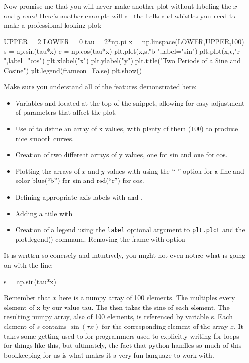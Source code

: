 Now promise me that you will never make another plot without labeling
the $x$ and $y$ axes! Here's another example will all the bells and
whistles you need to make a professional looking plot:
\begin{python}
UPPER = 2
LOWER = 0
tau   = 2*np.pi
x = np.linspace(LOWER,UPPER,100)
s = np.sin(tau*x)
c = np.cos(tau*x)
plt.plot(x,s,"b-",label="sin")
plt.plot(x,c,"r-",label="cos")
plt.xlabel("x")
plt.ylabel("y")
plt.title("Two Periods of a Sine and Cosine")
plt.legend(frameon=False)
plt.show()
\end{python}
Make sure you understand all of the features demonstrated here:
\begin{itemize}
 \item Variables  and  located at the top of
   the snippet, allowing for easy adjustment of parameters that affect
   the plot.
 \item Use of  to define an array of x values, with
   plenty of them (100) to produce nice smooth curves.
 \item Creation of two different arrays of y values, one for sin and one for cos.
 \item Plotting the arrays of $x$ and $y$ values with  using the ``-'' option for a line and color blue(``b'') for sin and red(``r'') for cos. 
 \item Defining appropriate axis labels with  and . 
 \item Adding a title with 
 \item Creation of a legend using the {\tt label} optional argument to {\tt plt.plot} and the {plot.legend()} command.  Removing the frame with option 
\end{itemize}
It is written so concisely and intuitively, you might not even notice
what is going on with the line:
\begin{python}
s = np.sin(tau*x)  
\end{python}
Remember that $x$ here is a numpy array of 100 elements.  The
 multiples every element of x by our value tau.  The
 then takes the sine of each element.  The
resulting numpy array, also of 100 elements, is referenced by variable
s.  Each element of $s$ contains $\sin(\tau x)$ for the corresponding
element of the array $x$.  It takes some getting used to for
programmers used to explicitly writing for loops for things like this,
but ultimately, the fact that python handles so much of this
bookkeeping for us is what makes it a very fun language to work with.\\

